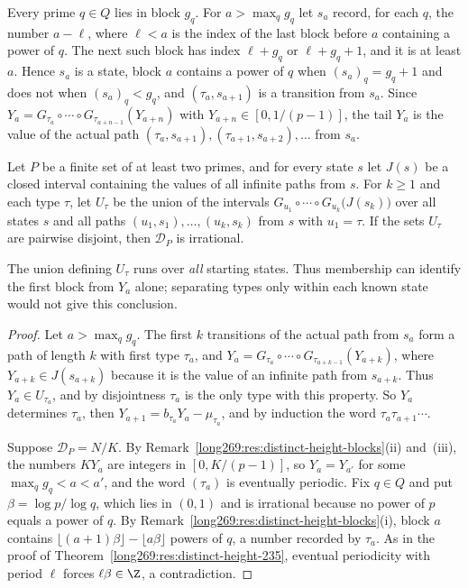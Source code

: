 Every prime $q\in Q$ lies in block $g_q$.  For $a>\max_qg_q$ let $s_a$ record,
for each $q$, the number $a-\ell$, where $\ell<a$ is the index of the last
block before $a$ containing a power of $q$.  The next such block has index
$\ell+g_q$ or $\ell+g_q+1$, and it is at least $a$.  Hence $s_a$ is a state,
block $a$ contains a power of $q$ when $(s_a)_q=g_q+1$ and does not when
$(s_a)_q<g_q$, and $(\tau_a,s_{a+1})$ is a transition from $s_a$.  Since
$Y_a=G_{\tau_a}\circ\cdots\circ G_{\tau_{a+n-1}}(Y_{a+n})$ with
$Y_{a+n}\in[0,1/(p-1)]$, the tail $Y_a$ is the value of the actual path
$(\tau_a,s_{a+1}),(\tau_{a+1},s_{a+2}),\ldots$ from $s_a$.

\begin{remark}\label{long269:res:distinct-height-criterion}
Let $P$ be a finite set of at least two primes, and for every state $s$ let
$J(s)$ be a closed interval containing the values of all infinite paths from
$s$.  For $k\ge1$ and each type $\tau$, let $U_\tau$ be the union of the
intervals $G_{u_1}\circ\cdots\circ G_{u_k}\bigl(J(s_k)\bigr)$ over all states
$s$ and all paths $(u_1,s_1),\ldots,(u_k,s_k)$ from $s$ with $u_1=\tau$.  If
the sets $U_\tau$ are pairwise disjoint, then $\mathcal D_P$ is irrational.
\end{remark}


The union defining $U_\tau$ runs over \emph{all} starting states.
Thus membership can identify the first block from $Y_a$ alone; separating
types only within each known state would not give this conclusion.

\begin{proof}
Let $a>\max_qg_q$.  The first $k$ transitions of the actual path from $s_a$
form a path of length $k$ with first type $\tau_a$, and
$Y_a=G_{\tau_a}\circ\cdots\circ G_{\tau_{a+k-1}}(Y_{a+k})$, where
$Y_{a+k}\in J(s_{a+k})$ because it is the value of an infinite path from
$s_{a+k}$.  Thus $Y_a\in U_{\tau_a}$, and by disjointness $\tau_a$ is the
only type with this property.  So $Y_a$ determines $\tau_a$, then
$Y_{a+1}=b_{\tau_a}Y_a-\mu_{\tau_a}$, and by induction the word
$\tau_a\tau_{a+1}\cdots$.

Suppose $\mathcal D_P=N/K$.  By
Remark~\ref{long269:res:distinct-height-blocks}(ii) and~(iii), the numbers
$KY_a$ are integers in $[0,K/(p-1)]$, so $Y_a=Y_{a'}$ for some
$\max_qg_q<a<a'$, and the word $(\tau_a)$ is eventually periodic.  Fix
$q\in Q$ and put $\beta=\log p/\log q$, which lies in $(0,1)$ and is
irrational because no power of $p$ equals a power of $q$.  By
Remark~\ref{long269:res:distinct-height-blocks}(i), block $a$ contains
$\lfloor(a+1)\beta\rfloor-\lfloor a\beta\rfloor$ powers of $q$, a number
recorded by $\tau_a$.  As in the proof of
Theorem~\ref{long269:res:distinct-height-235}, eventual periodicity with
period $\ell$ forces $\ell\beta\in\Z$, a contradiction.
\end{proof}

